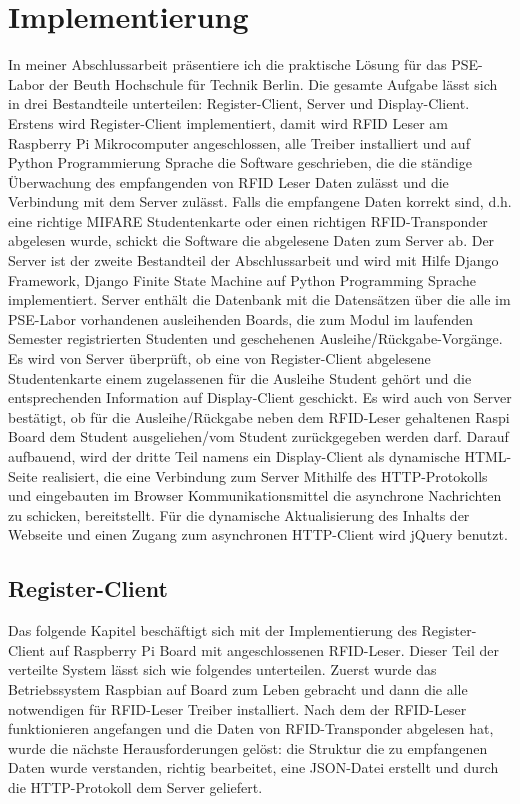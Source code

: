 \chapter{Implementierung}
In meiner Abschlussarbeit präsentiere ich die praktische Lösung für das PSE-Labor der Beuth Hochschule für Technik Berlin. Die gesamte Aufgabe lässt sich in drei Bestandteile unterteilen: Register-Client, Server und Display-Client. Erstens wird Register-Client implementiert, damit wird RFID Leser am Raspberry Pi Mikrocomputer angeschlossen, alle Treiber installiert und auf Python Programmierung Sprache die Software geschrieben, die die ständige Überwachung des empfangenden von RFID Leser Daten zulässt und die Verbindung mit dem Server zulässt. Falls die empfangene Daten korrekt sind, d.h.  eine richtige MIFARE Studentenkarte oder einen richtigen RFID-Transponder abgelesen wurde, schickt die Software die abgelesene Daten zum Server ab. Der Server ist der zweite Bestandteil der Abschlussarbeit und wird mit Hilfe Django Framework, Django Finite State Machine auf Python Programming Sprache implementiert. Server enthält die Datenbank mit die Datensätzen über die alle im PSE-Labor vorhandenen ausleihenden Boards, die zum Modul im laufenden Semester registrierten Studenten und  geschehenen Ausleihe/Rückgabe-Vorgänge. Es wird von Server überprüft, ob eine von Register-Client abgelesene Studentenkarte einem zugelassenen für die Ausleihe Student gehört und die entsprechenden Information auf Display-Client geschickt. Es wird auch von Server bestätigt, ob für die Ausleihe/Rückgabe neben dem RFID-Leser gehaltenen Raspi Board dem Student ausgeliehen/vom Student zurückgegeben werden darf. Darauf aufbauend, wird der dritte Teil namens ein Display-Client als dynamische HTML-Seite realisiert, die eine Verbindung zum Server Mithilfe des HTTP-Protokolls und eingebauten im Browser Kommunikationsmittel die asynchrone Nachrichten zu schicken, bereitstellt. Für die dynamische Aktualisierung des Inhalts der Webseite und einen Zugang zum asynchronen HTTP-Client wird jQuery benutzt.
\section{Register-Client}
\label{sec:register_client}
Das folgende Kapitel beschäftigt sich mit der Implementierung des Register-Client auf Raspberry Pi Board mit angeschlossenen RFID-Leser. Dieser Teil der verteilte System lässt sich wie folgendes unterteilen. Zuerst wurde das Betriebssystem Raspbian auf Board zum Leben gebracht und dann die alle notwendigen für RFID-Leser Treiber installiert. Nach dem der RFID-Leser funktionieren angefangen und die Daten von RFID-Transponder abgelesen hat, wurde die nächste Herausforderungen gelöst: die Struktur die zu empfangenen Daten wurde verstanden, richtig bearbeitet, eine JSON-Datei erstellt und durch die HTTP-Protokoll dem Server geliefert. 

